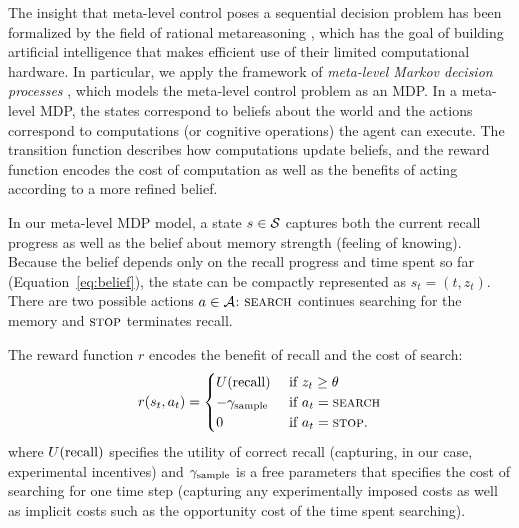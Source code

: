 The insight that meta-level control poses a sequential decision problem has been formalized by the field of rational metareasoning \citep{russell1991principles}, which has the goal of building artificial intelligence that makes efficient use of their limited computational hardware. In particular, we apply the framework of \emph{meta-level Markov decision processes} \citep{hay2012selecting}, which models the meta-level control problem as an MDP. In a meta-level MDP, the states correspond to beliefs about the world and the actions correspond to computations (or cognitive operations) the agent can execute. The transition function describes how computations update beliefs, and the reward function encodes the cost of computation as well as the benefits of acting according to a more refined belief.

In our meta-level MDP model, a state $s \in \S$ captures both the current recall progress as well as the belief about memory strength (feeling of knowing). Because the belief depends only on the recall progress and time spent so far (Equation~\ref{eq:belief}), the state can be compactly represented as $s_t = (t, z_t)$. There are two possible actions $a \in \A$: $\search$ continues searching for the memory and $\term$ terminates recall. 

The reward function $r$ encodes the benefit of recall and the cost of search:
\begin{equation}\label{eq:reward}
  r(s_t, a_t) = \begin{cases} 
    U\recall & \text{ if } z_t \geq \theta \\
    -\samplecost & \text{ if } a_t = \search \\
    0 & \text{ if } a_t = \term.
  \end{cases}
\end{equation}
where $U\recall$ specifies the utility of correct recall (capturing, in our case, experimental incentives) and $\samplecost$ is a free parameters that specifies the cost of searching for one time step (capturing any experimentally imposed costs as well as implicit costs such as the opportunity cost of the time spent searching).

